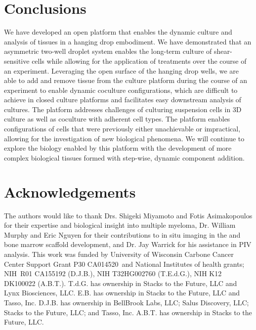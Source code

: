 \section{Conclusions}
We have developed an open platform that enables the dynamic culture and analysis of tissues in a hanging drop embodiment. We have demonstrated that an asymmetric two-well droplet system enables the long-term culture of shear-sensitive cells while allowing for the application of treatments over the course of an experiment. Leveraging the open surface of the hanging drop wells, we are able to add and remove tissue from the culture platform during the course of an experiment to enable dynamic coculture configurations, which are difficult to achieve in closed culture platforms and facilitates easy downstream analysis of cultures. The platform addresses challenges of culturing suspension cells in 3D culture as well as coculture with adherent cell types. The platform enables configurations of cells that were previously either unachievable or impractical, allowing for the investigation of new biological phenomena. We will continue to explore the biology enabled by this platform with the development of more complex biological tissues formed with step-wise, dynamic component addition. 

\section{Acknowledgements}
The authors would like to thank Drs. Shigeki Miyamoto and Fotis Asimakopoulos for their expertise and biological insight into multiple myeloma, Dr. William Murphy and Eric Nguyen for their contributions to in situ imaging in the  and bone marrow scaffold development, and Dr. Jay Warrick for his assistance in PIV analysis. This work was funded by University of Wisconsin Carbone Cancer Center Support Grant P30 CA014520 and National Institutes of health grants; NIH R01 CA155192 (D.J.B.), NIH T32HG002760 (T.E.d.G.), NIH K12 DK100022 (A.B.T.). T.d.G. has ownership in Stacks to the Future, LLC and Lynx Biosciences, LLC. E.B. has ownership in Stacks to the Future, LLC and Tasso, Inc.   D.J.B. has ownership in BellBrook Labs, LLC; Salus Discovery, LLC; Stacks to the Future, LLC; and Tasso, Inc. A.B.T. has ownership in Stacks to the Future, LLC.
